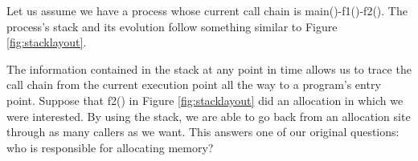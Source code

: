 Let us assume we have a process whose current call chain is main()-f1()-f2(). The process's stack and its evolution follow something similar to Figure \ref{fig:stacklayout}.

The information contained in the stack at any point in time allows us to trace the call chain from the current execution point all the way to a program's entry point. Suppose that f2() in Figure \ref{fig:stacklayout} did an allocation in which we were interested. By using the stack, we are able to go back from an allocation site through as many callers as we want. This answers one of our original questions: who is responsible for allocating memory?

